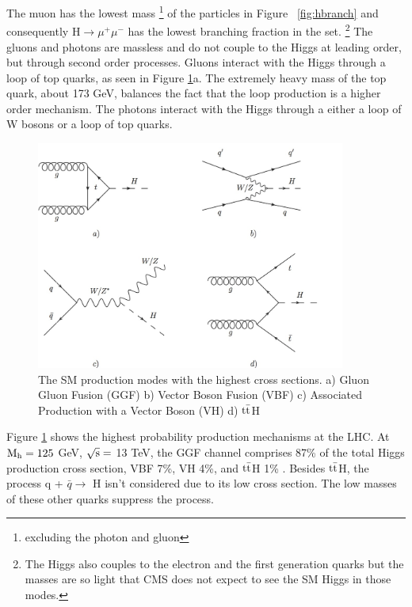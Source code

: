 The muon has the lowest mass \footnote{excluding the photon and gluon} of the particles in Figure ~\ref{fig:hbranch} and consequently H$\rightarrow \mu^{+}\mu^{-}$ has the lowest branching fraction in the set. \footnote{The Higgs also couples to the electron and the first generation quarks but the masses are so light that CMS does not expect to see the SM Higgs in those modes.} The gluons and photons are massless and do not couple to the Higgs at leading order, but through second order processes. Gluons interact with the Higgs through a loop of top quarks, as seen in Figure \ref{fig:hfeynprod}a. The extremely heavy mass of the top quark, about 173 GeV, balances the fact that the loop production is a higher order mechanism. The photons interact with the Higgs through a either a loop of W bosons or a loop of top quarks. 
\begin{figure}[h!]
  \centering
  \includegraphics[width=4in]{images/higgs_production_modes.png}
  \caption
   {The SM production modes with the highest cross sections. a) Gluon Gluon Fusion (GGF) b) Vector Boson Fusion (VBF) c) Associated Production with a Vector Boson (VH) d) ${\rm t\bar{t}}$H}
  \label{fig:hfeynprod}
\end{figure}
Figure \ref{fig:hfeynprod} shows the highest probability production mechanisms at the LHC. At ${\rm M_{h} = 125}$ GeV, ${\rm \sqrt{s} =}$ 13 TeV, the GGF channel comprises 87\% of the total Higgs production cross section, VBF 7\%, VH 4\%, and ${\rm t\bar{t}}$H 1\% \cite{crossbranchplots}. Besides ${\rm t\bar{t}}$H, the process q + $\bar{q} \rightarrow$ H isn't considered due to its low cross section. The low masses of these other quarks suppress the process. 

